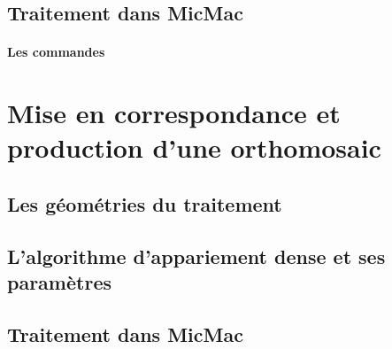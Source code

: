 \documentclass[11pt,a4paper,oneside]{book}
\begin{document}
\section{Traitement dans MicMac}



\subsubsection{Les commandes}

\chapter{Mise en correspondance et production d'une orthomosaic}

\section{Les géométries du traitement}
\section{L’algorithme d'appariement dense et ses paramètres}
\section{Traitement dans MicMac}
\end{document}
